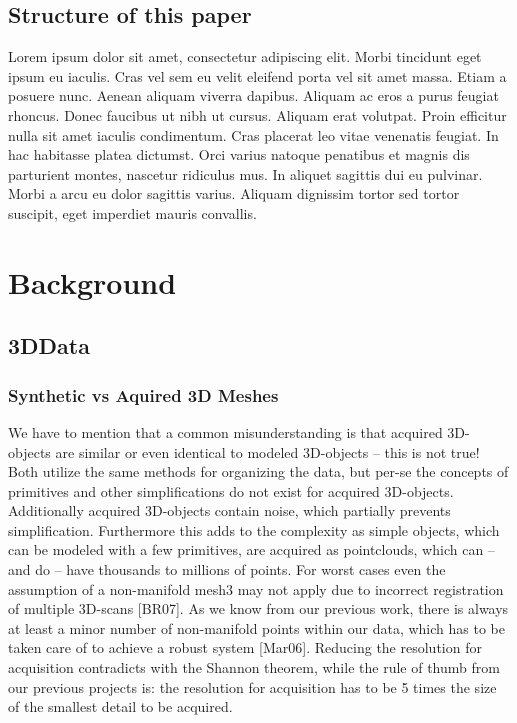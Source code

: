 \documentclass[openany]{book}
\begin{document}
\section{Structure of this paper}
Lorem ipsum dolor sit amet, consectetur adipiscing elit. Morbi tincidunt eget 
ipsum eu iaculis. Cras vel sem eu velit eleifend porta vel sit amet massa. Etiam 
a posuere nunc. Aenean aliquam viverra dapibus. Aliquam ac eros a purus feugiat 
rhoncus. Donec faucibus ut nibh ut cursus. Aliquam erat volutpat. Proin efficitur 
nulla sit amet iaculis condimentum. Cras placerat leo vitae venenatis feugiat. In 
hac habitasse platea dictumst. Orci varius natoque penatibus et magnis dis 
parturient montes, nascetur ridiculus mus. In aliquet sagittis dui eu pulvinar. 
Morbi a arcu eu dolor sagittis varius. Aliquam dignissim tortor sed tortor 
suscipit, eget imperdiet mauris convallis.



\chapter{Background}
\section{3DData}
\subsection{Synthetic vs Aquired 3D Meshes}
We have to mention that a common misunderstanding is that acquired 3D-objects
are similar or even identical to modeled 3D-objects – this is not true! 
Both utilize the same methods for organizing the data, but per-se the concepts 
of primitives and other simplifications do not exist for acquired 3D-objects. 
Additionally acquired 3D-objects contain noise, which partially prevents 
simplification. Furthermore this adds to the complexity as simple objects, 
which can be modeled with a few primitives, are acquired as pointclouds, which 
can – and do – have thousands to millions of points. For worst cases even the 
assumption of a non-manifold mesh3 may not apply due to incorrect registration 
of multiple 3D-scans [BR07]. As we know from our previous work, there is always 
at least a minor number of non-manifold points within our data, which has to be 
taken care of to achieve a robust system [Mar06]. Reducing the resolution for 
acquisition contradicts with the Shannon theorem, while the rule of thumb from 
our previous projects is: the resolution for acquisition has to be 5 times the 
size of the smallest detail to be acquired.~\cite[p.~25]{Mara12}
\end{document}
